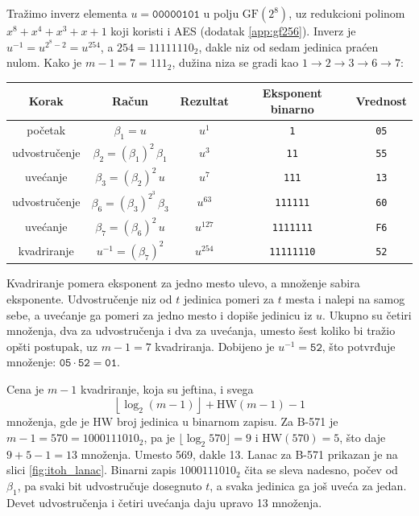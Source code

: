 \begin{example}
\label{ex:itoh_gf8}
Tražimo inverz elementa $u = \mathtt{00000101}$ u polju $\mathrm{GF}(2^8)$, uz redukcioni polinom $x^8 + x^4 + x^3 + x + 1$ koji koristi i AES (dodatak \ref{app:gf256}). Inverz je $u^{-1} = u^{2^8 - 2} = u^{254}$, a $254 = 11111110_2$, dakle niz od sedam jedinica praćen nulom. Kako je $m - 1 = 7 = 111_2$, dužina niza se gradi kao $1 \to 2 \to 3 \to 6 \to 7$:
\begin{center}
{\setlength{\tabcolsep}{7pt}\renewcommand{\arraystretch}{1.35}\small
\begin{tabular}{|c|c|c|c|c|}
\hline
\rowcolor{gray!30}
Korak & Račun & Rezultat & Eksponent binarno & Vrednost \\
\hline
početak & $\beta_1 = u$ & $u^{1}$ & \texttt{1} & \texttt{05} \\
\hline
udvostručenje & $\beta_2 = (\beta_1)^{2}\,\beta_1$ & $u^{3}$ & \texttt{11} & \texttt{55} \\
\hline
uvećanje & $\beta_3 = (\beta_2)^{2}\,u$ & $u^{7}$ & \texttt{111} & \texttt{13} \\
\hline
udvostručenje & $\beta_6 = (\beta_3)^{2^3}\,\beta_3$ & $u^{63}$ & \texttt{111111} & \texttt{60} \\
\hline
uvećanje & $\beta_7 = (\beta_6)^{2}\,u$ & $u^{127}$ & \texttt{1111111} & \texttt{F6} \\
\hline
kvadriranje & $u^{-1} = (\beta_7)^{2}$ & $u^{254}$ & \texttt{11111110} & \texttt{52} \\
\hline
\end{tabular}}
\end{center}
Kvadriranje pomera eksponent za jedno mesto ulevo, a množenje sabira eksponente. Udvostručenje niz od $t$ jedinica pomeri za $t$ mesta i nalepi na samog sebe, a uvećanje ga pomeri za jedno mesto i dopiše jedinicu iz $u$. Ukupno su četiri množenja, dva za udvostručenja i dva za uvećanja, umesto šest koliko bi tražio opšti postupak, uz $m - 1 = 7$ kvadriranja. Dobijeno je $u^{-1} = \mathtt{52}$, što potvrđuje množenje: $\mathtt{05} \cdot \mathtt{52} = \mathtt{01}$.
\end{example}

Cena je $m-1$ kvadriranje, koja su jeftina, i svega
\begin{equation}
    \left\lfloor \log_2 (m-1) \right\rfloor + \mathrm{HW}(m-1) - 1
    \label{eq:itoh_cena}
\end{equation}
množenja, gde je $\mathrm{HW}$ broj jedinica u binarnom zapisu. Za B-571 je $m-1 = 570 = 1000111010_2$, pa je $\lfloor \log_2 570 \rfloor = 9$ i $\mathrm{HW}(570) = 5$, što daje $9 + 5 - 1 = 13$ množenja. Umesto 569, dakle 13.
\smallbreak
Lanac za B-571 prikazan je na slici \ref{fig:itoh_lanac}. Binarni zapis $1000111010_2$ čita se sleva nadesno, počev od $\beta_1$, pa svaki bit udvostručuje dosegnuto $t$, a svaka jedinica ga još uveća za jedan. Devet udvostručenja i četiri uvećanja daju upravo 13 množenja.

